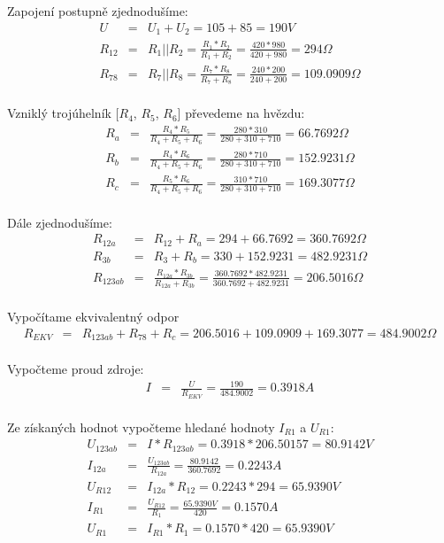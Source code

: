 \documentclass[a4paper,oneside,12pt]{article}
\begin{document}
	Zapojení postupně zjednodušíme:
	\begin{eqnarray*}
		U &= & U_{1} + U_{2} = 105 + 85 = 190V\\
		R_{12} &= & R_{1} || R_{2} = \frac{R_{1} * R_{2}}{R_{1} + R_{2}} = \frac{420 * 980}{420 + 980} = 294 \Omega\\
		R_{78} &= & R_{7} || R_{8} = \frac{R_{7} * R_{8}}{R_{7} + R_{8}} = \frac{240 * 200}{240 + 200} = 109.0909 \Omega\\
	\end{eqnarray*}

	Vzniklý trojúhelník [$R_{4}$, $R_{5}$, $R_{6}$] převedeme na hvězdu:
	\begin{eqnarray*}
		R_{a} &= & \frac{R_{4} * R_{5}}{R_{4} + R_{5} + R_{6}} = \frac{280 * 310}{280 + 310 + 710} = 66.7692 \Omega\\
		R_{b} &= & \frac{R_{4} * R_{6}}{R_{4} + R_{5} + R_{6}} = \frac{280 * 710}{280 + 310 + 710} = 152.9231 \Omega\\
		R_{c} &= & \frac{R_{5} * R_{6}}{R_{4} + R_{5} + R_{6}} = \frac{310 * 710}{280 + 310 + 710} = 169.3077 \Omega\\
	\end{eqnarray*}

	Dále zjednodušíme:
	\begin{eqnarray*}
		R_{12a} &= & R_{12} + R_{a} = 294 + 66.7692 = 360.7692 \Omega\\
		R_{3b} &= & R_{3} + R_{b} = 330 + 152.9231 = 482.9231 \Omega\\
		R_{123ab} &= & \frac{R_{12a} * R_{3b}}{R_{12a} + R_{3b}} = \frac{360.7692 * 482.9231}{360.7692 + 482.9231} = 206.5016 \Omega\\
	\end{eqnarray*}

	Vypočítame ekvivalentný odpor
	\begin{eqnarray*}
		R_{EKV} &= & R_{123ab} + R_{78} + R_{c} = 206.5016 + 109.0909 + 169.3077 = 484.9002 \Omega\\
	\end{eqnarray*}

	Vypočteme proud zdroje:
	\begin{eqnarray*}
		I &= & \frac{U}{R_{EKV}} = \frac{190}{484.9002} = 0.3918 A\\
	\end{eqnarray*}

	Ze získaných hodnot vypočteme hledané hodnoty $I_{R1}$ a $U_{R1}$:
	\begin{eqnarray*}
		U_{123ab} &= & I * R_{123ab} = 0.3918 * 206.50157 = 80.9142V\\
		I_{12a} &= &\frac{U_{123ab}}{R_{12a}} = \frac{80.9142}{360.7692} = 0.2243A\\
		U_{R12} &= & I_{12a} * R_{12} = 0.2243 * 294 = 65.9390V\\
		I_{R1} &= &\frac{U_{R12}}{R_{1}} = \frac{65.9390V}{420} = 0.1570A\\
		U_{R1} &= & I_{R1} * R_{1} = 0.1570 * 420 = 65.9390V\\
	\end{eqnarray*}
\end{document}
